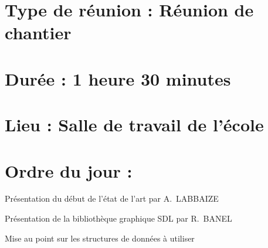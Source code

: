 \documentclass[11pt]{meetingmins}
\begin{document}
\maketitle
\section{Type de réunion : \textnormal{Réunion de chantier} }

\section{Durée : \textnormal{1 heure 30 minutes} }
\section{Lieu : \textnormal{Salle de travail de l'école} }


\section{}
\section{Ordre du jour :}
\begin{hiddenitems}
\item
Présentation du début de l'état de l'art par A.~LABBAIZE
\item
Présentation de la bibliothèque graphique SDL par R.~BANEL
\item 
Mise au point sur les structures de données à utiliser 
\end{hiddenitems}
\end{document}
